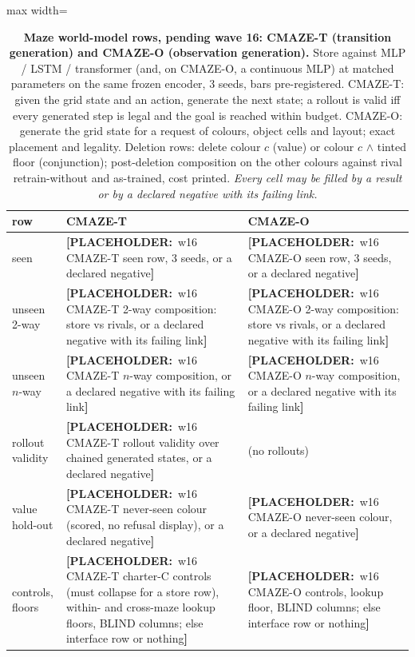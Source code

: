 \documentclass{article} %
\newcommand{\PLACEHOLDER}[1]{{\color{red}\textbf{[PLACEHOLDER:}~#1\textbf{]}}}
\begin{document}
\begin{table}[h]
\centering\scriptsize
\caption{\textbf{Maze world-model rows, pending wave 16: CMAZE-T (transition generation) and %
CMAZE-O (observation generation).} Store against MLP / LSTM / transformer (and, on CMAZE-O, a
continuous MLP) at matched parameters on the same frozen encoder, 3 seeds, bars pre-registered.
CMAZE-T: given the grid state and an action, generate the next state; a rollout is valid iff every
generated step is legal and the goal is reached within budget. CMAZE-O: generate the grid state for
a request of colours, object cells and layout; exact placement and legality. Deletion rows: delete
colour $c$ (value) or colour $c$ $\wedge$ tinted floor (conjunction); post-deletion composition on
the other colours against rival retrain-without and as-trained, cost printed. \emph{Every cell may
be filled by a result or by a declared negative with its failing link.}}
\label{tab:cmazet}\label{tab:cmaze-del}\label{tab:cmazeo}
\setlength{\tabcolsep}{2pt}
\begin{adjustbox}{max width=\linewidth}\begin{tabular}{p{1.9cm}p{5.6cm}p{5.6cm}}
\toprule
row & CMAZE-T & CMAZE-O \\
\midrule
seen & \PLACEHOLDER{w16 CMAZE-T seen row, 3 seeds, or a declared negative} & \PLACEHOLDER{w16 CMAZE-O seen row, 3 seeds, or a declared negative} \\
unseen 2-way & \PLACEHOLDER{w16 CMAZE-T 2-way composition: store vs rivals, or a declared negative with its failing link} & \PLACEHOLDER{w16 CMAZE-O 2-way composition: store vs rivals, or a declared negative with its failing link} \\
unseen $n$-way & \PLACEHOLDER{w16 CMAZE-T $n$-way composition, or a declared negative with its failing link} & \PLACEHOLDER{w16 CMAZE-O $n$-way composition, or a declared negative with its failing link} \\
rollout validity & \PLACEHOLDER{w16 CMAZE-T rollout validity over chained generated states, or a declared negative} & (no rollouts) \\
value hold-out & \PLACEHOLDER{w16 CMAZE-T never-seen colour (scored, no refusal display), or a declared negative} & \PLACEHOLDER{w16 CMAZE-O never-seen colour, or a declared negative} \\
controls, floors & \PLACEHOLDER{w16 CMAZE-T charter-C controls (must collapse for a store row), within- and cross-maze lookup floors, BLIND columns; else interface row or nothing} & \PLACEHOLDER{w16 CMAZE-O controls, lookup floor, BLIND columns; else interface row or nothing} \\

\end{tabular}
\end{adjustbox}
\end{table}
\end{document}
